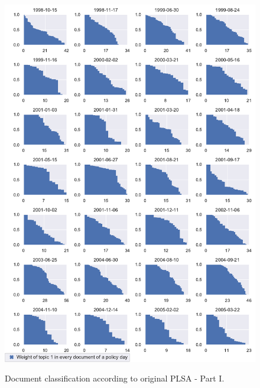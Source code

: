 \documentclass[11pt,a4paper,english,oneside]{book}
\numberwithin{equation}{chapter}
\begin{document}
\begin{figure}
	\caption{Document classification according to original PLSA - Part I.}
	\centering
	\includegraphics[scale=0.8]{Images/docsplit01_orig.pdf}
	\label{classdoc01}
\end{figure}
\end{document}

